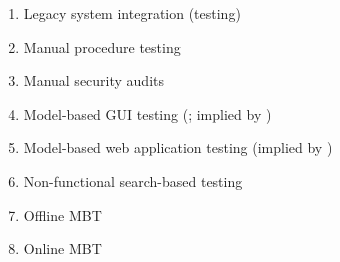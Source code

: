 \begin{enumerate}
        \item Legacy system integration (testing) \citep[Tab.~2]{Gerrard2000a}
        \item Manual procedure testing \citep[p.~47]{Firesmith2015}
        \item Manual security audits \citep[p.~28]{Gerrard2000b}
        \item Model-based GUI testing (\citealp[Tab.~1]{DoğanEtAl2014}; implied by \citealp[p.~356]{SakamotoEtAl2013})
        \item Model-based web application testing (implied by \citealp[p.~356]{SakamotoEtAl2013})
        \item Non-functional search-based testing \citep[Tab.~1]{DoğanEtAl2014}
        \item Offline MBT \citepISTQB{}
        \item Online MBT \citepISTQB{}

\end{enumerate}
